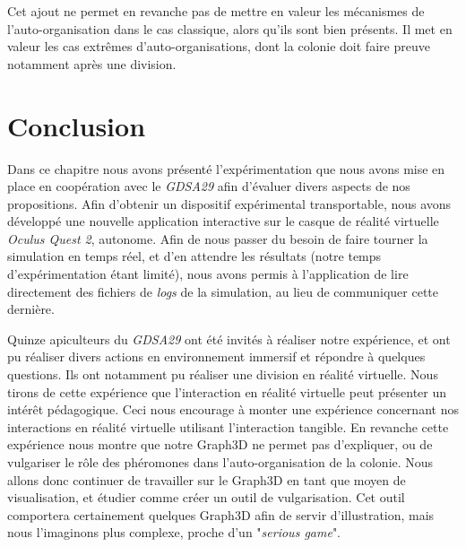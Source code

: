 	Cet ajout ne permet en revanche pas de mettre en valeur les mécanismes de l'auto-organisation dans le cas classique, alors qu'ils sont bien présents. Il met en valeur les cas extrêmes d'auto-organisations, dont la colonie doit faire preuve notamment après une division.
			
	\section*{Conclusion}
	Dans ce chapitre nous avons présenté l'expérimentation que nous avons mise en place en coopération avec le \textit{GDSA29} afin d'évaluer divers aspects de nos propositions. Afin d'obtenir un dispositif expérimental transportable, nous avons développé une nouvelle application interactive sur le casque de réalité virtuelle \textit{Oculus Quest 2}, autonome. Afin de nous passer du besoin de faire tourner la simulation en temps réel, et d'en attendre les résultats (notre temps d'expérimentation étant limité), nous avons permis à l'application de lire directement des fichiers de \textit{logs} de la simulation, au lieu de communiquer cette dernière.
	
	Quinze apiculteurs du \textit{GDSA29} ont été invités à réaliser notre expérience, et ont pu réaliser divers actions en environnement immersif et répondre à quelques questions. Ils ont notamment pu réaliser une division en réalité virtuelle. Nous tirons de cette expérience que l'interaction en réalité virtuelle peut présenter un intérêt pédagogique. Ceci nous encourage à monter une expérience concernant nos interactions en réalité virtuelle utilisant l'interaction tangible. En revanche cette expérience nous montre que notre Graph3D ne permet pas d'expliquer, ou de vulgariser le rôle des phéromones dans l'auto-organisation de la colonie. Nous allons donc continuer de travailler sur le Graph3D en tant que moyen de visualisation, et étudier comme créer un outil de vulgarisation. Cet outil comportera certainement quelques Graph3D afin de servir d'illustration, mais nous l'imaginons plus complexe, proche d'un "\textit{serious game}".